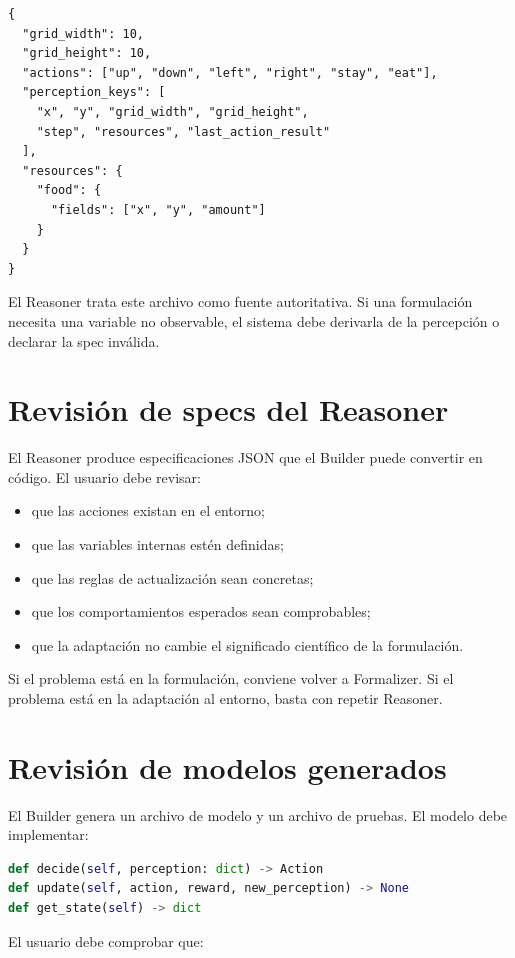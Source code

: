 \begin{verbatim}
{
  "grid_width": 10,
  "grid_height": 10,
  "actions": ["up", "down", "left", "right", "stay", "eat"],
  "perception_keys": [
    "x", "y", "grid_width", "grid_height",
    "step", "resources", "last_action_result"
  ],
  "resources": {
    "food": {
      "fields": ["x", "y", "amount"]
    }
  }
}
\end{verbatim}

El Reasoner trata este archivo como fuente autoritativa. Si una formulación
necesita una variable no observable, el sistema debe derivarla de la percepción
o declarar la spec inválida.

\section{Revisión de specs del Reasoner}

El Reasoner produce especificaciones JSON que el Builder puede convertir en
código. El usuario debe revisar:

\begin{itemize}
\item que las acciones existan en el entorno;
\item que las variables internas estén definidas;
\item que las reglas de actualización sean concretas;
\item que los comportamientos esperados sean comprobables;
\item que la adaptación no cambie el significado científico de la formulación.
\end{itemize}

Si el problema está en la formulación, conviene volver a Formalizer. Si el
problema está en la adaptación al entorno, basta con repetir Reasoner.

\section{Revisión de modelos generados}

El Builder genera un archivo de modelo y un archivo de pruebas. El modelo debe
implementar:

\begin{lstlisting}[language=Python]
def decide(self, perception: dict) -> Action
def update(self, action, reward, new_perception) -> None
def get_state(self) -> dict
\end{lstlisting}

El usuario debe comprobar que:

